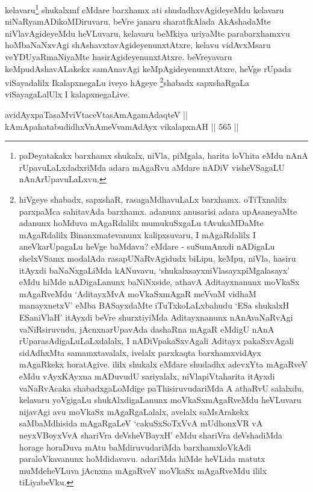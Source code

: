 \begin{artha}
kelavaru\footnote{paDeyatakakx barxhamx shukalx, niVla, piMgala,
harita loVhita eMdu nAnA rUpavuLaLxdadxriMda adara mAgaRvu aMdare
nADiV visheVSagaLU nAnArUpavuLaLxvu.} shukalxmf eMdare barxhamx ati shudadhxvAgideyeMdu
kelavaru niNaRyamADikoMDiruvaru. beVre janaru sharatfkAlada
AkAshadaMte niVlavAgideyeMdu heVLuvaru, kelavaru beMkiya uriyaMte
parabarxhamxvu hoMbaNaNxvAgi shAshavxtavAgideyenunxtAtxre, kelavu
vidAvxMsaru veYDUyaRmaNiyaMte hasirAgideyenunxtAtxre. beVreyavaru
keMpudAshavALakekx samAnavAgi keMpAgideyenunxtAtxre, heVge rUpada
viSayadalilx IkalapxnegaLu iveyo hAgeye \footnote{hiVgeye shabadx,
sapxshaR, rasagaMdhavuLaLx barxhamx. oTiTxnalilx parxpaMca sahitavAda
barxhamx. adanunx anusarisi adara upAsaneyaMte adanunx hoMduva
mAgaRdalilx mumukuSxgaLu tAvukaMDaMte mAgaRdalilx Binanxmatevanunx
kalipxsuvaru, I mAgaRdalilx I aneVkarUpagaLu heVge baMdavu?
eMdare - suSumAnxdi nADigaLu shelxVSamx modalAda rasapUNaRvAgidudx
biLipu, keMpu, niVla, hasiru itAyxdi baNaNxgaLiMda kANuvavu,
`shukalxsayxniVlasayxpiMgalasayx' eMdu hiMde nADigaLanunx
baNiNxside, athavA Aditayxnanunx moVkaSx mAgaRveMdu `AditayxMvA
moVkaSxmAgaR meVvaM vidhaM manayxnetxV' eMba BASayxdaMte
iTuTxkoLaLxbahudu `ESa shukalxH ESaniVlaH' itAyxdi beVre
shurxtiyiMda Aditayxnanunx nAnAvaNaRvAgi vaNiRsiruvudu,
jAcnxnarUpavAda dashaRna mAgaR eMdigU nAnA rUparasAdigaLuLaLxdalalx,
I nADiVpakaSxvAgali Aditayx pakaSxvAgali sidAdhxMta samamxtavalalx,
ivelalx parxkaqta barxhamxvidAyx mAgaRkekx horatAgive. ililx shukalx
eMdare shudadhx adevxYta mAgaRveV eMdu vAyxKAyxna mADuvudU
sariyalalx, niVlapiVtaharita itAyxdi vaNaRvAcaka shabadxgaLoMdige
paThisiruvudariMda A athaRvU salalxdu, kelavaru yoVgigaLu
shukAlxdigaLanunx moVkaSxmAgaRveMdu heVLuvaru nijavAgi avu moVkaSx
mAgaRgaLalalx, avelalx saMsArakekx saMbaMdhisida mAgaRgaLeV `cakuSxSoTxVvA mUdhonxVR vA \s neyxVBoyxVvA shariVra deVsheVBayxH' eMdu shariVra deVshadiMda horage horaDuva mAtu baMdiruvudariMda
barxhamxloVkAdi paraloVkavanunx hoMdidavavu. adariMda hiMde heVLida
matutx muMdeheVLuva jAcnxna mAgaRveV moVkaSx mAgaRveMdu ililx tiLiyabeVku.}shabadx
sapxshaRgaLa viSayagaLalUlx I kalapxnegaLive.
\end{artha}


\begin{shl}
avidAyxpaTasaMviVtaceVtasAmAgamAdaqteV || \\
kAmApahatabudidhxVnAmeVvamAdAyx vikalapxnAH \hfill || 565 ||  
\end{shl}

